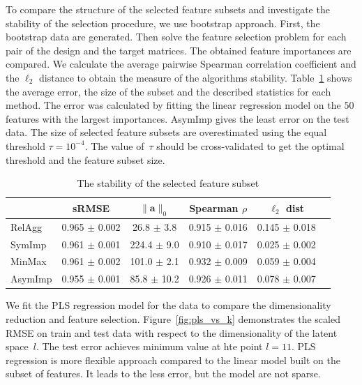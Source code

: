 \documentclass[12pt,twoside]{article}
\theoremstyle{definition}
\newcommand{\ba}{\mathbf{a}}
\begin{document}
To compare the structure of the selected feature subsets and investigate the stability of the selection procedure, we use bootstrap approach. 
First, the bootstrap data are generated. 
Then solve the feature selection problem for each pair of the design and the target matrices.
The obtained feature importances are compared. 
We calculate the average pairwise Spearman correlation coefficient and the $\ell_2$ distance to obtain the measure of the algorithms stability.
Table~\ref{tbl:stability} shows the average error, the size of the subset and the described statistics for each method. The error was calculated by fitting the linear regression model on the $50$ features with the largest importances.
AsymImp gives the least error on the test data. 
The size of selected feature subsets are overestimated using the equal threshold $\tau=10^{-4}$. 
The value of~$\tau$ should be cross-validated to get the optimal threshold and the feature subset size. 

\begin{table}[]
	\caption{The stability of the selected feature subset}
	\centering
	\begin{tabular}{l|ccccc}
		\hline
		& sRMSE  & $\|\ba\|_0$ & Spearman $\rho$ & $\ell_2$ dist \\ \hline
		RelAgg & 0.965 $\pm$ 0.002 & 26.8 $\pm$ 3.8 & 0.915 $\pm$ 0.016 & 0.145 $\pm$ 0.018   \\
		SymImp & 0.961 $\pm$ 0.001 & 224.4 $\pm$ 9.0 & 0.910 $\pm$ 0.017 & 0.025 $\pm$ 0.002   \\
		MinMax & 0.961 $\pm$ 0.002 & 101.0 $\pm$ 2.1& 0.932 $\pm$ 0.009 & 0.059 $\pm$ 0.004   \\
		AsymImp & 0.955 $\pm$ 0.001 & 85.8 $\pm$ 10.2& 0.926 $\pm$ 0.011 & 0.078 $\pm$ 0.007  \\ \hline
	\end{tabular}
	\label{tbl:stability}
\end{table}

We fit the PLS regression model for the data to compare the dimensionality reduction and feature selection. 
Figure~\ref{fig:pls_vs_k} demonstrates the scaled RMSE on train and test data with respect to the dimensionality of the latent space~$l$.
The test error achieves minimum value at hte point $l = 11$.
PLS regression is more flexible approach compared to the linear model built on the subset of features.
It leads to the less error, but the model are not sparse.
\end{document}
